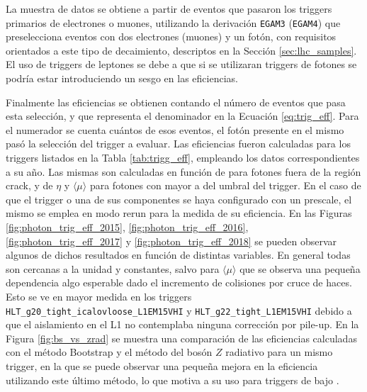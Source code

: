 La muestra de datos se obtiene a partir de eventos que pasaron los triggers primarios de electrones o muones, utilizando la derivación \texttt{EGAM3} (\texttt{EGAM4}) que preselecciona eventos con dos electrones (muones) y un fotón, con requisitos orientados a este tipo de decaimiento, descriptos en la Sección \ref{sec:lhc_samples}. El uso de triggers de leptones se debe a que si se utilizaran triggers de fotones se podría estar introduciendo un sesgo en las eficiencias.

Finalmente las eficiencias se obtienen contando el número de eventos que pasa esta selección, y que representa el denominador en la Ecuación \ref{eq:trig_eff}. Para el numerador se cuenta cuántos de esos eventos, el fotón presente en el mismo pasó la selección del trigger a evaluar. Las eficiencias fueron calculadas para los triggers listados en la Tabla \ref{tab:trigg_eff}, empleando los datos correspondientes a su año. Las mismas son calculadas en función de \ET para fotones fuera de la región crack, y de $\eta$ y $\langle\mu\rangle$ para fotones con \ET mayor a  del umbral del trigger. En el caso de que el trigger o una de sus componentes se haya configurado con un prescale, el mismo se emplea en modo rerun para la medida de su eficiencia. En las Figuras \ref{fig:photon_trig_eff_2015}, \ref{fig:photon_trig_eff_2016}, \ref{fig:photon_trig_eff_2017} y \ref{fig:photon_trig_eff_2018} se pueden observar algunos de dichos resultados en función de distintas variables. En general todas son cercanas a la unidad y constantes, salvo para $\langle\mu\rangle$ que se observa una pequeña dependencia algo esperable dado el incremento de colisiones por cruce de haces. Esto se ve en mayor medida en los triggers \texttt{HLT\_g20\_tight\_icalovloose\_L1EM15VHI} y \texttt{HLT\_g22\_tight\_L1EM15VHI} debido a que 
el aislamiento en el L1 no contemplaba ninguna corrección por pile-up.
En la Figura \ref{fig:bs_vs_zrad} se muestra una comparación de las eficiencias calculadas con el método Bootstrap \cite{tesis_joaco} y el método del bosón $Z$ radiativo para un mismo trigger, en la que se puede observar una pequeña mejora en la eficiencia utilizando este último método, lo que motiva a su uso para triggers de bajo \ET.

